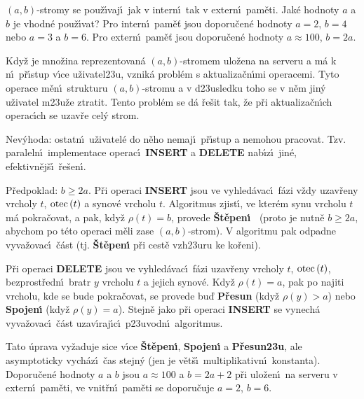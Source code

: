 \flushpar $\left(a,b\right)$-stromy se pou\v z\'\i vaj\'\i\ jak v intern\'\i\ tak v 
extern\'\i\ pam\v eti. Jak\'e hodnoty $a$ a $b$ je vhodn\'e 
pou\v z\'\i vat?\newline 
Pro intern\'\i\ pam\v e\v t jsou doporu\v cen\'e hodnoty $a=2$, $
b=4$ 
nebo $a=3$ a $b=6$.\newline 
Pro extern\'\i\ pam\v e\v t jsou doporu\v cen\'e hodnoty $a\approx 
100$, 
$b=2a$.
\medskip

\flushpar Kdy\v z je mno\v zina reprezentovan\'a $\left(a,b\right)$-stromem 
ulo\v zena na serveru a m\'a k n\'\i\ p\v r\'\i stup v\'\i ce 
u\v zivatel\accent23u, vznik\'a probl\'em s aktualiza\v cn\'\i mi 
operacemi. Tyto operace m\v en\'\i\ strukturu $\left(a,b\right)$-stromu a 
v d\accent23usledku toho se v n\v em jin\'y u\v zivatel 
m\accent23u\v ze ztratit. Tento probl\'em se d\'a  
\v re\v sit tak, \v ze p\v ri aktu\-aliza\v cn\'\i ch operac\'\i ch 
se uzav\v re cel\'y strom.
\medskip 

\flushpar Nev\'yhoda: ostatn\'\i\ u\v zivatel\'e  
do n\v eho nemaj\'\i\ p\v r\'\i stup a nemohou pracovat. Tzv. paraleln\'\i\ 
implementace operac\'\i\ {\bf INSERT} a {\bf DELETE} nab\'\i z\'\i\ jin\'e, 
efektivn\v ej\v s\'\i\ \v re\v sen\'\i .
\medskip

\flushpar P\v redpoklad: $b\ge 2a$. \newline 
P\v ri operaci {\bf INSERT} jsou ve vyhled\'avac\'\i\ f\'azi v\v zdy 
uzav\v reny vrcholy $t$, $\operatorname{otec}\left(t\right)$ a synov\'e vrcholu $t$. 
Algoritmus zjist\'\i , ve kter\'em synu vrcholu $t$ m\'a 
pokra\v covat, a pak, kdy\v z $\rho \left(t\right)=b$, provede {\bf \v St\v epen\'\i\ }
(proto je nutn\v e $b\ge 2a$, abychom po t\'eto ope\-raci m\v eli 
zase $\left(a,b\right)$-strom). V algoritmu pak odpadne vyva\-\v zo\-vac\'\i\ 
\v c\'ast (tj. {\bf \v St\v epen\'\i} p\v ri cest\v e vzh\accent23uru ke 
ko\v reni).
\medskip

\flushpar P\v ri operaci {\bf DELETE} jsou ve vyhled\'avac\'\i\ f\'azi uzav\v reny 
vrcholy $t$, $\operatorname{otec}\left(t\right)$, bezprost\v redn\'\i\ bratr $y$ vrcholu $
t$ a 
jejich synov\'e. 
Kdy\v z $\rho \left(t\right)=a$, pak po najiti vrcholu, kde se bude 
pokra\v covat, se provede bu\v d {\bf P\v resun} (kdy\v z $\rho \left(
y\right)>a$) nebo 
{\bf Spojen\'\i} (kdy\v z $\rho \left(y\right)=a$). Stejn\v e jako p\v ri operaci 
{\bf INSERT} se vynech\'a vyva\-\v zo\-vac\'\i\ \v c\'ast 
uzav\'\i raj\'\i c\'\i\ p\accent23uvodn\'\i\ algoritmus.
\medskip

\flushpar Tato \'uprava vy\v zaduje sice v\'\i ce {\bf \v St\v epen\'\i }, {\bf Spojen\'\i} a
{\bf P\v resun\accent23u}, ale asymptoticky vych\'az\'\i\ \v cas stejn\'y 
(jen je v\v et\v s\'\i\ multiplikativn\'\i\ konstanta). Doporu\v cen\'e 
hodnoty $a$ a $b$ jsou $a\approx 100$ a $b=2a+2$ p\v ri ulo\v zen\'\i\ na serveru 
v extern\'\i\ pam\v eti, ve vnit\v rn\'\i\ pam\v eti 
se doporu\v cuje $a=2$, $b=6$.
\medskip

